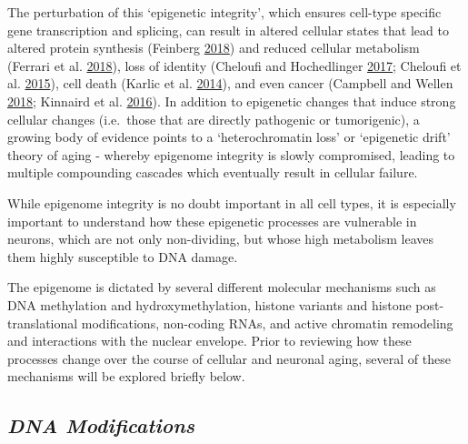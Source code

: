 \documentclass[onehalf,12pt]{beavtex}
\begin{document}
  The perturbation of this `epigenetic integrity', which ensures cell-type
  specific gene transcription and splicing, can result in altered cellular
  states that lead to altered protein synthesis (Feinberg
  \protect\hyperlink{ref-Feinbergkeyroleepigenetics2018}{2018}) and
  reduced cellular metabolism (Ferrari et al.
  \protect\hyperlink{ref-FerrariEpigenomemodifiersmetabolic2018}{2018}),
  loss of identity (Cheloufi and Hochedlinger
  \protect\hyperlink{ref-CheloufiEmergingroleshistone2017}{2017}; Cheloufi
  et al. \protect\hyperlink{ref-CheloufihistonechaperoneCAF12015}{2015}),
  cell death (Karlic et al.
  \protect\hyperlink{ref-Karlicroleepigeneticsregulation2014}{2014}), and
  even cancer (Campbell and Wellen
  \protect\hyperlink{ref-CampbellMetabolicSignalingNucleus2018}{2018};
  Kinnaird et al.
  \protect\hyperlink{ref-KinnairdMetaboliccontrolepigenetics2016}{2016}).
  In addition to epigenetic changes that induce strong cellular changes
  (i.e.~those that are directly pathogenic or tumorigenic), a growing body
  of evidence points to a `heterochromatin loss' or `epigenetic drift'
  theory of aging - whereby epigenome integrity is slowly compromised,
  leading to multiple compounding cascades which eventually result in
  cellular failure.
  
  While epigenome integrity is no doubt important in all cell types, it is
  especially important to understand how these epigenetic processes are
  vulnerable in neurons, which are not only non-dividing, but whose high
  metabolism leaves them highly susceptible to DNA damage.
  
  The epigenome is dictated by several different molecular mechanisms such
  as DNA methylation and hydroxymethylation, histone variants and histone
  post-translational modifications, non-coding RNAs, and active chromatin
  remodeling and interactions with the nuclear envelope. Prior to
  reviewing how these processes change over the course of cellular and
  neuronal aging, several of these mechanisms will be explored briefly
  below.
  
  \subsection*{\texorpdfstring{\emph{DNA
  Modifications}}{DNA Modifications}}\label{dna-modifications}
  
\end{document}

